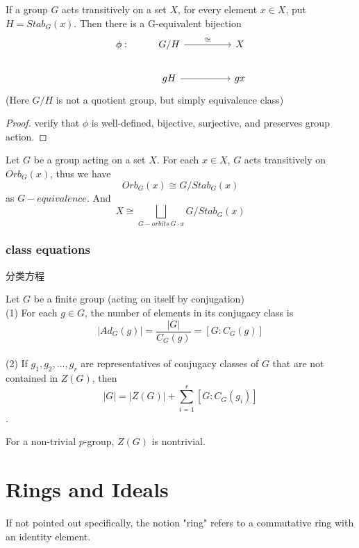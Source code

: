 \documentclass[11pt,fleqn]{book} %
\begin{document}
\begin{CJK}{UTF8}{gkai}
\begin{proposition}
	If a group $G$ acts transitively on a set $X$, for every element $x \in X$, put $H = Stab_G(x)$. Then there is a G-equivalent bijection
	\[\begin{tikzcd}
		{\phi:} & {G/H} && X \\
		& gH && gx
		\arrow["\cong", from=1-2, to=1-4]
		\arrow[from=2-2, to=2-4]
	\end{tikzcd}\]
	(Here $G/H$ is not a quotient group, but simply equivalence class)
\end{proposition}
\begin{proof}
	verify that $\phi$ is well-defined, bijective, surjective, and preserves group action.
\end{proof}

\begin{corollary}
	Let $G$ be a group acting on a set $X$. For each $x \in X$, $G$ acts transitively on $Orb_G(x)$, thus we have
	\[Orb_G(x) \cong G/Stab_G(x)\] as $G-equivalence$.
	And 
	\[X\cong \bigsqcup_{G-orbits \ G\cdot x} G/Stab_G(x)\] 
\end{corollary}

\subsection{class equations}
分类方程
\begin{theorem}
	 Let $G$ be a finite group (acting on itself by conjugation) \\
	(1) For each $g \in G$, the number of elements in its conjugacy class is \[|Ad_G(g)| = \frac {|G|} {C_G(g)} = [G:C_G(g)]\] \\
	(2) If $g_1, g_2,...,g_r$ are representatives of conjugacy classes of $G$ that are not contained in $Z(G)$, then 
	\[|G| = |Z(G)| + \sum_{i=1}^r [G : C_G(g_i)]\].
\end{theorem}

\begin{proposition}
	For a non-trivial $p$-group, $Z(G)$ is nontrivial. 
\end{proposition}

\chapter{Rings and Ideals}
If not pointed out specifically, the notion "ring" refers to a commutative ring with an identity element. 


\end{CJK}
\end{document}
